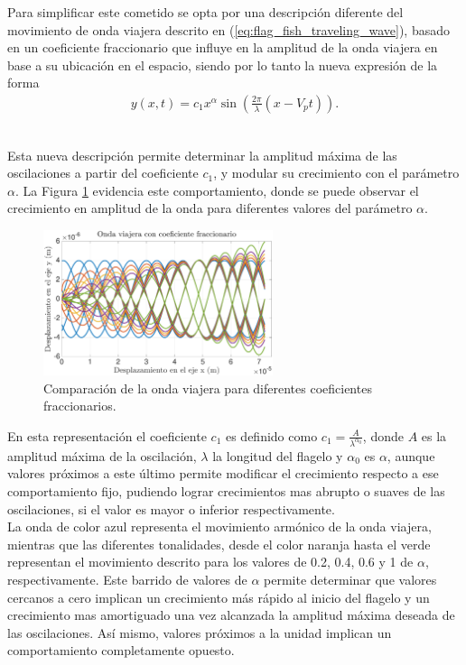 Para simplificar este cometido se opta por una descripción diferente del movimiento de onda viajera descrito en (\ref{eq:flag_fish_traveling_wave}), basado en un coeficiente fraccionario que influye en la amplitud de la onda viajera en base a su ubicación en el espacio, siendo por lo tanto la nueva expresión de la forma
\begin{eqnarray}
	\label{eq:flag_fish_traveling_wave_fractional}
	y (x,t) = c_1 x^{\alpha} \sin \left( \frac{2 \pi}{\lambda}  ( x - V_p t) \right).
\end{eqnarray}
\

Esta nueva descripción permite determinar la amplitud máxima de las oscilaciones a partir del coeficiente $c_1$, y modular su crecimiento con el parámetro $\alpha$. La Figura \ref{fig:OVF} evidencia este comportamiento, donde se puede observar el crecimiento en amplitud de la onda para diferentes valores del parámetro $\alpha$.
\begin{figure}[!h] %
	\vspace*{3mm}
    \centering
    \includegraphics[width=0.6\textwidth]{Figuras/OVF}
  	\caption{Comparación de la onda viajera para diferentes coeficientes fraccionarios.}
  	\label{fig:OVF}
\end{figure}
 En esta representación el coeficiente $c_1$ es definido como $c_1 = \frac{A}{\lambda^{\alpha_0}}$, donde $A$ es la amplitud máxima de la oscilación, $\lambda$ la longitud del flagelo y $\alpha_0$ es $\alpha$, aunque valores próximos a este último permite modificar el crecimiento respecto a ese comportamiento fijo, pudiendo lograr crecimientos mas abrupto o suaves de las oscilaciones, si el valor es mayor o inferior respectivamente.\\
 
La onda de color azul representa el movimiento armónico de la onda viajera, mientras que las diferentes tonalidades, desde el color naranja hasta el verde representan el movimiento descrito para los valores de 0.2, 0.4, 0.6 y 1 de $\alpha$, respectivamente. Este barrido de valores de $\alpha$ permite determinar que valores cercanos a cero implican un crecimiento más rápido al inicio del flagelo y un crecimiento mas amortiguado una vez alcanzada la amplitud máxima deseada de las oscilaciones. Así mismo, valores próximos a la unidad implican un comportamiento completamente opuesto.\\


